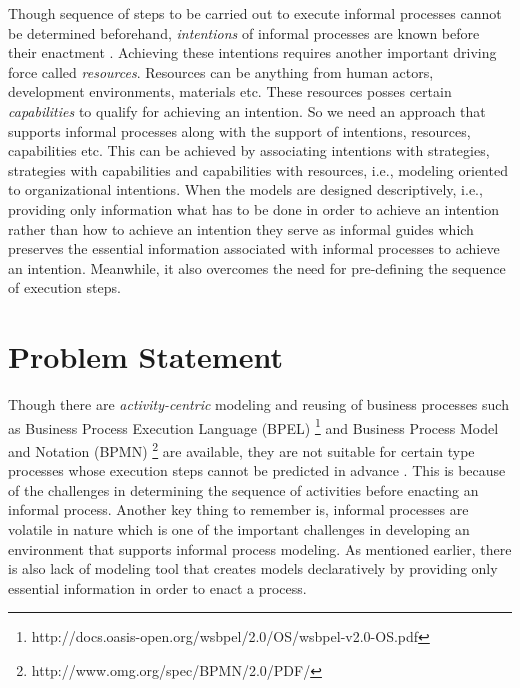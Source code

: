Though sequence of steps to be carried out to execute informal processes cannot be determined beforehand, \textit{intentions} of informal processes are known before their enactment \cite{Sungur2015}. Achieving these intentions requires another important driving force called \textit{resources}. Resources can be anything from human actors, development environments, materials etc. These resources posses certain \textit{capabilities} to qualify for achieving an intention. So we need an approach that supports informal processes along with the support of intentions, resources, capabilities etc. This can be achieved by associating intentions with strategies, strategies with capabilities and capabilities with resources, i.e., modeling oriented to organizational intentions. When the models are designed descriptively, i.e., providing only information what has to be done in order to achieve an intention rather than how to achieve an intention they serve as informal guides which preserves the essential information associated with informal processes to achieve an intention. Meanwhile, it also overcomes the need for pre-defining the sequence of execution steps.

\section{Problem Statement}
\label{sec:problemstatement}
Though there are \textit{activity-centric} modeling and reusing of business processes such as Business Process Execution Language (BPEL) \footnote{http://docs.oasis-open.org/wsbpel/2.0/OS/wsbpel-v2.0-OS.pdf} and Business Process Model and Notation (BPMN) \footnote{http://www.omg.org/spec/BPMN/2.0/PDF/} are available, they are not suitable for certain type processes whose execution steps cannot be predicted in advance \cite{Sungur2014a}. This is because of the challenges in determining the sequence of activities before enacting an informal process. Another key thing to remember is, informal processes are volatile in nature which is one of the important challenges in developing an environment that supports informal process modeling. As mentioned earlier, there is also lack of modeling tool that creates models declaratively by providing only essential information in order to enact a process. 

